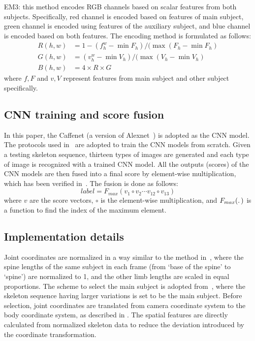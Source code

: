 \documentclass[5pt]{article}
\begin{document}
      EM3: this method encodes RGB channels based on scalar features from both 
subjects. Specifically, red channel is encoded based on features of main 
subject, green channel is encoded using features of the auxiliary subject, and 
blue channel is encoded based on both features. The encoding method is 
formulated as follows:
      \begin{equation}
      \begin{aligned}
      R(h,w) & = 1 - (f^w_h-\min F_h)/(\max (F_h-\min F_h)\\
      G(h,w) & = (v^w_h-\min V_h)/(\max (V_h-\min V_h)\\
      B(h,w) & = 4\times R \times G
      \end{aligned}
      \label{equ:rgb}
      \end{equation}
      where $f,F$ and $v,V$ represent features from main subject and other 
subject specifically. 
      
      \subsection{CNN training and score fusion}
      In this paper, the Caffenet (a version of 
Alexnet~\cite{krizhevsky2012imagenet}) is adopted as the CNN model. The 
protocols used in~\cite{Li2017,Shahroudy2016} are adopted to train the CNN 
models from scratch. Given a testing skeleton sequence, thirteen types of images 
are generated and each type of image is recognized with a trained CNN model. All 
the outputs (scores) of the CNN models are then fused into a final score by 
element-wise multiplication, which has been verified 
in~\cite{Pichaocvpr2017,Li2017}. The fusion is done as follows:
      \begin{equation}
      label=F_{max}(v_1\circ v_2 \cdots v_{12} \circ v_{13})
      \end{equation}
      where $v$ are the score vectors, $\circ$ is the element-wise 
multiplication, and $F_{max}(\ldotp)$ is a function to find the index of the 
maximum element.
      
      \subsection{Implementation details}
      Joint coordinates are normalized in a way similar to the method 
in~\cite{Shahroudy2016}, where the spine lengths of the same subject in each 
frame (from `base of the spine' to `spine') are normalized to 1, and the other 
limb lengths are scaled in equal proportions. The scheme to select the main 
subject is adopted from~\cite{Shahroudy2016}, where the skeleton sequence having 
larger variations is set to be the main subject. Before selection, joint 
coordinates are translated from camera coordinate system to the body coordinate 
system, as described in \cite{Zhang2017}. The spatial features are directly 
calculated from normalized skeleton data to reduce the deviation introduced by 
the coordinate transformation.
      
\end{document}
